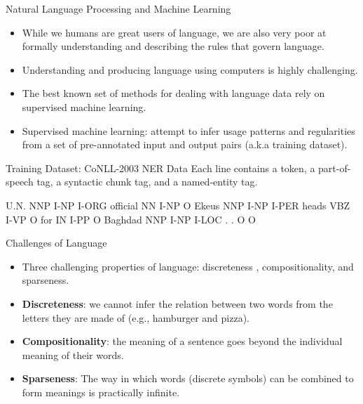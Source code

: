 \documentclass[handout]{beamer}
\begin{document}
\begin{frame}{Natural Language Processing and Machine Learning}
\begin{scriptsize}
\begin{itemize}

\item While we humans are great users of language, we are also very poor at formally understanding and describing the rules that govern  language.

\item  Understanding and producing language using computers is highly challenging.
\item The best known set of methods for dealing with language data rely on supervised machine learning.
\item Supervised machine learning: attempt to infer usage patterns and regularities from a set of pre-annotated input and output pairs (a.k.a training dataset).

\end{itemize}
\end{scriptsize}
\end{frame}


\begin{frame}[fragile]{Training Dataset: CoNLL-2003 NER Data}
Each line contains a token, a part-of-speech tag, a syntactic chunk tag, and a named-entity tag.
\begin{center}
\begin{semiverbatim}
U.N.         NNP  I-NP  I-ORG 
official     NN   I-NP  O
Ekeus        NNP  I-NP  I-PER
heads        VBZ  I-VP  O
for          IN   I-PP  O
Baghdad      NNP  I-NP  I-LOC
.            .    O     O
\end{semiverbatim}
\end{center}


\end{frame}


\begin{frame}{Challenges of Language}
\begin{scriptsize}
\begin{itemize}
\item Three challenging properties of language: discreteness , compositionality, and sparseness.
\item \textbf{Discreteness}: we cannot infer the relation between two words from the letters they are made of (e.g., hamburger and pizza). 
\item \textbf{Compositionality}: the meaning of a sentence goes beyond the individual meaning of their words. 
\item \textbf{Sparseness}: The way in which words
(discrete symbols) can be combined to form meanings is practically infinite.
\end{itemize}
\end{scriptsize}
\end{frame}
\end{document}
